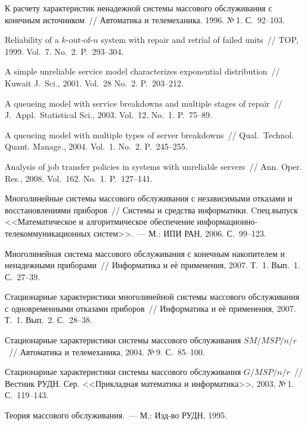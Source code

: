 \begin{multicols}{2}
{{\begin{thebibliography}{99}
К расчету характеристик ненадежной системы массового обслуживания с конечным источником~//
Автоматика и телемеханика. 1996. №\,1. С.\ 92--103.

Reliability of a $k$-out-of-$n$ system with repair and retrial of failed units~//
TOP, 1999. Vol.~7. No.~2. P.~293--304.

A simple unreliable service model characterizes exponential distribution~//
Kuwait J.\ Sci., 2001. Vol.~28 No.~2. P.~203--212.

A queueing model with service breakdowns and multiple stages of repair~//
J.\ Appl.\ Statistical Sci., 2003. Vol.~12. No.~1. P.~75--89.

A queueing model with multiple types of server breakdowns~//
Qual.\ Technol. Quant. Manage., 2004. Vol.~1. No.~2. P.~245--255.

Analysis of job transfer policies in systems with unreliable servers~//
Ann. Oper. Res., 2008. Vol.~162. No.~1. P.~127--141.

Многолинейные системы массового обслуживания с независимыми
отказами и восстановлениями приборов~//
Системы и средства информатики.
Cпец.\linebreak выпуск <<Математическое и алгоритмическое обеспечение
информационно-телекоммуникационных сис\-тем>>.~---
М.: ИПИ РАН, 2006. С.~99--123.

Многолинейная система массового обслуживания с конечным
накопителем и ненадежными приборами~//
Информатика и её применения, 2007. Т.~1. Вып.~1. С.~27--39.

Стационарные характеристики многолинейной системы массового
обслуживания с одновременными отказами приборов~//
Информатика и её применения, 2007. Т.~1. Вып.~2. С.~28--38.

Стационарные характеристики системы массового обслуживания $SM/MSP/n/r$~//
Автоматика и телемеханика, 2004. №\,9. С.~85--100.

Стационарные характеристики системы массового обслуживания $G/MSP/n/r$~//
Вестник РУДН. Сер. <<Прикладная математика и информатика>>,
2003. №\,1. С.~119--143.


\label{end\stat}


Теория массового обслуживания.~---
М.: Изд-во РУДН, 1995.
 \end{thebibliography}
}
}
\end{multicols}
 